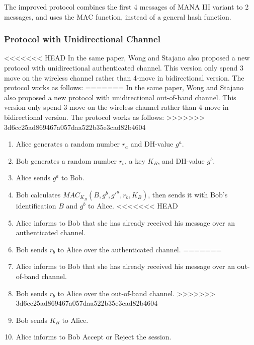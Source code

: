 The improved protocol combines the first 4 messages of MANA III variant to 2 messages, and uses the MAC function, instead of a general hash function. 
 
\subsubsection*{Protocol with Unidirectional Channel}

<<<<<<< HEAD
In the same paper, Wong and Stajano also proposed a new protocol with unidirectional authenticated channel. This version only spend 3 move on the wireless channel rather than 4-move in bidirectional version. The protocol works as follows:
=======
In the same paper, Wong and Stajano also proposed a new protocol with unidirectional out-of-band channel. This version only spend 3 move on the wireless channel rather than 4-move in bidirectional version. The protocol works as follows:
>>>>>>> 3d6cc25ad869467a057daa522b35e3cad82b4604
\begin{enumerate}
\item Alice generates a random number $r_a$ and DH-value $g^a$.
\item Bob generates a random number $r_b$, a key $K_B$, and DH-value $g^b$.
\item Alice sends $g^a$ to Bob. 
\item Bob calculates $MAC_{K_B}(B,g^b,g'^a,r_b,K_B)$, then sends it with Bob's identification $B$ and $g^b$ to Alice.
<<<<<<< HEAD
\item Alice informs to Bob that she has already received his message over an authenticated channel. 
\item Bob sends $r_b$ to Alice over the authenticated channel. 
=======
\item Alice informs to Bob that she has already received his message over an out-of-band channel. 
\item Bob sends $r_b$ to Alice over the out-of-band channel. 
>>>>>>> 3d6cc25ad869467a057daa522b35e3cad82b4604
\item Bob sends $K_B$ to Alice. 
\item Alice informs to Bob Accept or Reject the session.
\end{enumerate}

